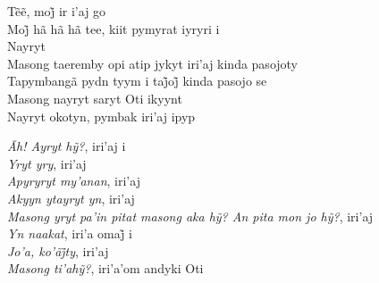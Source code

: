 \begin{linenumbers}\begingroup\raggedright
\noindent Tẽẽ, moj̃ ir i’aj go\\
Moj̃ hã hã hã tee, kiit pymyrat iyryri i\\
Nayryt\\
Masong taeremby opi atip jykyt iri'aj kinda pasojoty\\
Tapymbangã pydn tyym i taj̃oj̃ kinda pasojo se\\
Masong nayryt saryt Oti ikyynt\\
Nayryt okotyn, pymbak iri'aj ipyp

\end{linenumbers}\endgroup

\bigskip

\begin{linenumbers}\begingroup\raggedright
\noindent \emph{Ãh! Ayryt hỹ?}, iri’aj i\\
\emph{Yryt yry}, iri'aj\\
\emph{Apyryryt my'anan}, iri'aj\\
\emph{Akyyn ytayryt yn}, iri'aj\\
\emph{Masong yryt pa’in pitat masong aka hỹ? An pita mon jo hỹ?}, iri’aj\\
\emph{Yn naakat}, iri’a omaj̃ i\\
\emph{Jo’a, ko’ãj̃ty}, iri’aj\\
\emph{Masong ti’ahỹ?}, iri’a’om andyki Oti

\end{linenumbers}\endgroup

